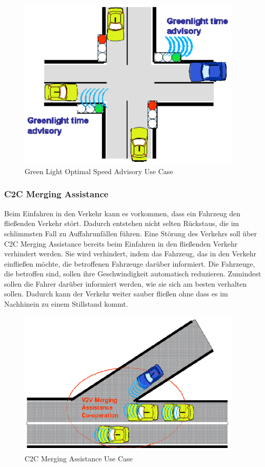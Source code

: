 \begin{figure}[htbp]
\includegraphics[width=0.95\textwidth]{content/images/06_use_cases/greenlight_opimalspeed.png}
\caption{Green Light Optimal Speed Advisory Use Case \cite{etsi102638}}
\label{fig:glos}
\end{figure}

\subsubsection{C2C Merging Assistance}
Beim Einfahren in den Verkehr kann es vorkommen, dass ein Fahrzeug den fließenden Verkehr stört. Dadurch entstehen nicht selten Rückstaus, die im schlimmsten Fall zu Auffahrunfällen führen. Eine Störung des Verkehrs soll über C2C Merging Assistance bereits beim Einfahren in den fließenden Verkehr verhindert werden. Sie wird verhindert, indem das Fahrzeug, das in den Verkehr einfließen möchte, die betroffenen Fahrzeuge darüber informiert. Die Fahrzeuge, die betroffen sind, sollen ihre Geschwindigkeit automatisch reduzieren. Zumindest sollen die Fahrer darüber informiert werden, wie sie sich am besten verhalten sollen. Dadurch kann der Verkehr weiter sauber fließen ohne dass es im Nachhinein zu einem Stillstand kommt. 

\begin{figure}[htbp]
\includegraphics[width=0.95\textwidth]{content/images/06_use_cases/merging_assistance.png}
\caption{C2C Merging Assistance Use Case \cite{etsi102638}}
\label{fig:mergingassistance}
\end{figure}
